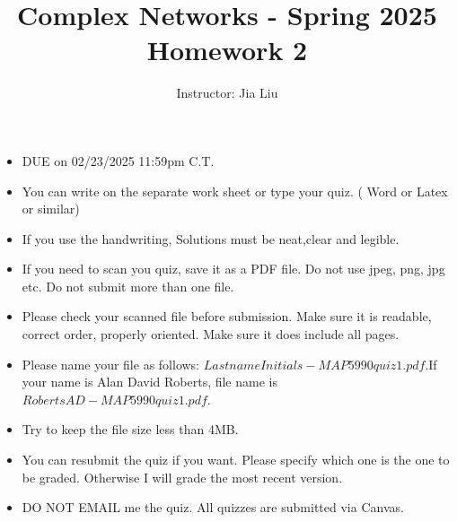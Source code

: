 \documentclass{amsart}
\theoremstyle{definition}
\theoremstyle{remark}
\numberwithin{equation}{section}
\begin{document}
\title{Complex Networks  - Spring 2025\\{\bf Homework 2}}%
\author{Instructor: Jia Liu}%
\date{}


\maketitle
\begin{itemize}
\item DUE on 02/23/2025 11:59pm C.T.
\item You can write on the separate work sheet or type your quiz. ( Word or Latex or similar)
\item If you use the handwriting, Solutions must be neat,clear and legible.
\item If you need to scan you quiz, save it as a PDF file. Do not use jpeg, png, jpg etc. Do not submit more than one file.
\item Please check your scanned file before submission. Make sure it is readable, correct order, properly oriented. Make sure it does include all pages.
\item Please name your file as follows: $LastnameInitials-MAP5990quiz1.pdf$.If your name is Alan David Roberts, file name is $RobertsAD-MAP5990quiz1.pdf$.
\item Try to keep the file size less than 4MB.
\item You can resubmit the quiz if you want. Please specify which one is the one to be graded. Otherwise I will grade the most recent version.
\item DO NOT EMAIL me the quiz. All quizzes are submitted via Canvas.
\end{itemize}
\end{document}
